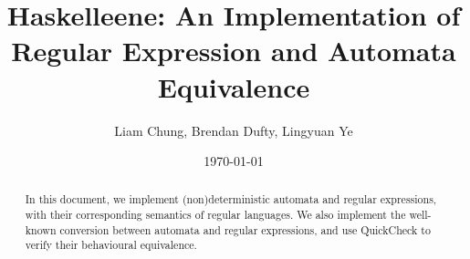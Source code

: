 \documentclass[12pt]{article}
\title{Haskelleene: An Implementation of Regular Expression and Automata Equivalence}
\author{Liam Chung, Brendan Dufty, Lingyuan Ye}
\date{\today}
\begin{document}
\maketitle

\begin{abstract}
  In this document, we implement (non)deterministic automata and regular expressions, with their corresponding semantics of regular languages. We also implement the well-known conversion between automata and regular expressions, and use QuickCheck to verify their behavioural equivalence.
\end{abstract}

\vfill

\tableofcontents

\clearpage


% 







% 







\end{document}
